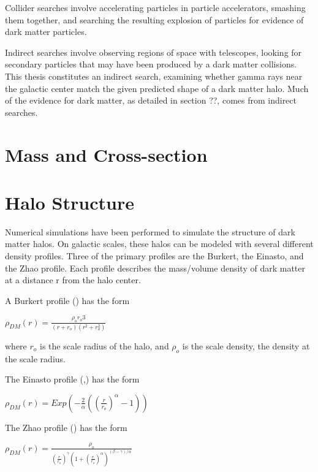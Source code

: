Collider searches involve accelerating particles in particle accelerators, smashing them together, and searching the resulting explosion of particles for evidence of dark matter particles.

Indirect searches involve observing regions of space with telescopes, looking for secondary particles that may have been produced by a dark matter collisions.
This thesis constitutes an indirect search, examining whether gamma rays near the galactic center match the given predicted shape of a dark matter halo.
Much of the evidence for dark matter, as detailed in section ??, comes from indirect searches.



\section{Mass and Cross-section}


\section{Halo Structure}
Numerical simulations have been performed to simulate the structure of dark matter halos.
On galactic scales, these halos can be modeled with several different density profiles.
Three of the primary profiles are the Burkert, the Einasto, and the Zhao profile.
Each profile describes the mass/volume density of dark matter at a distance r from the halo center.

A Burkert profile (\cite{burkertprofile}) has the form

$ \rho_{DM} \left( r \right) = \frac{ \rho_o r_o3}{ \left( r + r_o \right) \left( r^2 + r_o^2 \right)} $ \label{eqn:burkert}

where $r_o$ is the scale radius of the halo, and $\rho_o$ is the scale density, the density at the scale radius.

The Einasto profile (\cite{einastoprofile1},\cite{einastoprofile2}) has the form

$ \rho_{DM} \left( r \right) = Exp \left( - \frac{2}{\alpha} \left( {\left( \frac{r}{r_o} \right)}^{\alpha} - 1 \right) \right)$ \label{eqn:einasto}

The Zhao profile (\cite{zhaoprofile}) has the form

$ \rho_{DM} \left( r \right) = \frac{\rho_o}{ {\left( \frac{r}{r_o} \right)}^{\gamma} {\left( 1 + {\left( \frac{r}{r_o} \right)}^{\alpha} \right)}^{ \left(\beta - \gamma \right) / \alpha} } $ \label{eqn:zhao}

